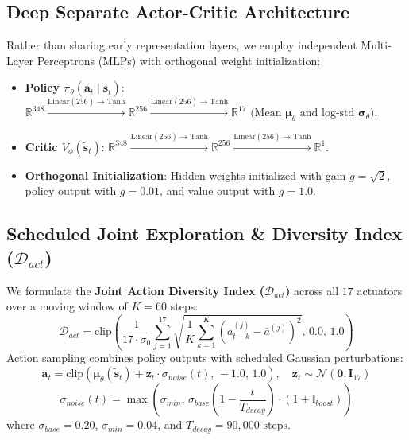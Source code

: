 \documentclass{article}
\begin{document}
\subsection{Deep Separate Actor-Critic Architecture}
Rather than sharing early representation layers, we employ independent Multi-Layer Perceptrons (MLPs) with orthogonal weight initialization:
\begin{itemize}
    \item \textbf{Policy $\pi_\theta(\mathbf{a}_t \mid \tilde{\mathbf{s}}_t)$}: $\mathbb{R}^{348} \xrightarrow{\text{Linear}(256) \to \text{Tanh}} \mathbb{R}^{256} \xrightarrow{\text{Linear}(256) \to \text{Tanh}} \mathbb{R}^{17} \text{ (Mean } \bm{\mu}_\theta \text{ and log-std } \bm{\sigma}_\theta)$.
    \item \textbf{Critic $V_\phi(\tilde{\mathbf{s}}_t)$}: $\mathbb{R}^{348} \xrightarrow{\text{Linear}(256) \to \text{Tanh}} \mathbb{R}^{256} \xrightarrow{\text{Linear}(256) \to \text{Tanh}} \mathbb{R}^{1}$.
    \item \textbf{Orthogonal Initialization}: Hidden weights initialized with gain $g = \sqrt{2}$, policy output with $g = 0.01$, and value output with $g = 1.0$.
\end{itemize}

\subsection{Scheduled Joint Exploration \& Diversity Index ($\mathcal{D}_{act}$)}
We formulate the \textbf{Joint Action Diversity Index ($\mathcal{D}_{act}$)} across all $17$ actuators over a moving window of $K=60$ steps:
\begin{equation}
\mathcal{D}_{act} = \text{clip}\left( \frac{1}{17 \cdot \sigma_0} \sum_{j=1}^{17} \sqrt{\frac{1}{K} \sum_{k=1}^K \left( a_{t-k}^{(j)} - \bar{a}^{(j)} \right)^2}, \, 0.0, \, 1.0 \right)
\end{equation}
Action sampling combines policy outputs with scheduled Gaussian perturbations:
\begin{equation}
\mathbf{a}_t = \text{clip}\left( \bm{\mu}_\theta(\tilde{\mathbf{s}}_t) + \mathbf{z}_t \cdot \sigma_{noise}(t), \, -1.0, \, 1.0 \right), \quad \mathbf{z}_t \sim \mathcal{N}(\mathbf{0}, \mathbf{I}_{17})
\end{equation}
\begin{equation}
\sigma_{noise}(t) = \max\left( \sigma_{min}, \, \sigma_{base} \left( 1 - \frac{t}{T_{decay}} \right) \cdot (1 + \mathbb{I}_{boost}) \right)
\end{equation}
where $\sigma_{base} = 0.20$, $\sigma_{min} = 0.04$, and $T_{decay} = 90,000\text{ steps}$.
\end{document}
